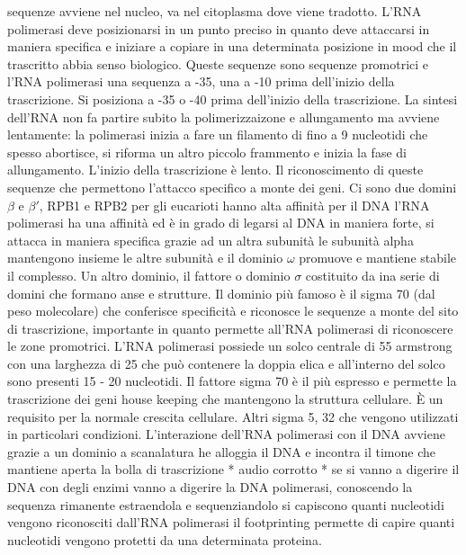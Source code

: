 sequenze avviene nel nucleo, va nel citoplasma dove viene tradotto. L'RNA polimerasi deve posizionarsi in un punto preciso in quanto deve attaccarsi in maniera specifica e iniziare a 
copiare in una determinata posizione in mood che il trascritto abbia senso biologico. Queste sequenze sono sequenze promotrici e l'RNA polimerasi una sequenza a -35, una a -10 prima 
dell'inizio della trascrizione. Si posiziona a -35 o -40 prima dell'inizio della trascrizione. La sintesi dell'RNA non fa partire subito la polimerizzaizone e allungamento ma avviene
lentamente: la polimerasi inizia a fare un filamento di fino a 9 nucleotidi che spesso abortisce, si riforma un altro piccolo frammento e inizia la fase di allungamento. L'inizio della
trascrizione \`e lento. Il riconoscimento di queste sequenze che permettono l'attacco specifico a monte dei geni. Ci sono due domini $\beta$ e $\beta'$, RPB1 e RPB2 per gli eucarioti 
hanno alta affinit\`a per il DNA l'RNA polimerasi ha una affinit\`a ed \`e in grado di legarsi al DNA in maniera forte, si attacca in maniera specifica grazie ad un altra subunit\`a 
le subunit\`a alpha mantengono insieme le altre subunit\`a e il dominio $\omega$ promuove e mantiene stabile il complesso. Un altro dominio, il fattore o dominio $\sigma$ costituito da
ina serie di domini che formano anse e strutture. Il dominio pi\`u famoso \`e il sigma 70 (dal peso molecolare) che conferisce specificit\`a e riconosce le sequenze a monte del sito di 
trascrizione, importante in quanto permette all'RNA polimerasi di riconoscere le zone promotrici. L'RNA polimerasi possiede un solco centrale di 55 armstrong con una larghezza di 25 che 
pu\`o contenere la doppia elica e all'interno del solco sono presenti 15 - 20 nucleotidi. Il fattore sigma 70 \`e il pi\`u espresso e permette la trascrizione dei geni house keeping
che mantengono la struttura cellulare. \`E un requisito per la normale crescita cellulare. Altri sigma 5, 32 che vengono utilizzati in particolari condizioni. L'interazione dell'RNA 
polimerasi con il DNA avviene grazie a un dominio a scanalatura he alloggia il DNA e incontra il timone che mantiene aperta la bolla di trascrizione * audio corrotto * se si vanno a 
digerire il DNA con degli enzimi vanno a digerire la DNA polimerasi, conoscendo la sequenza rimanente estraendola e sequenziandolo si capiscono quanti nucleotidi vengono riconosciti 
dall'RNA polimerasi il footprinting permette di capire quanti nucleotidi vengono protetti da una determinata proteina. 
